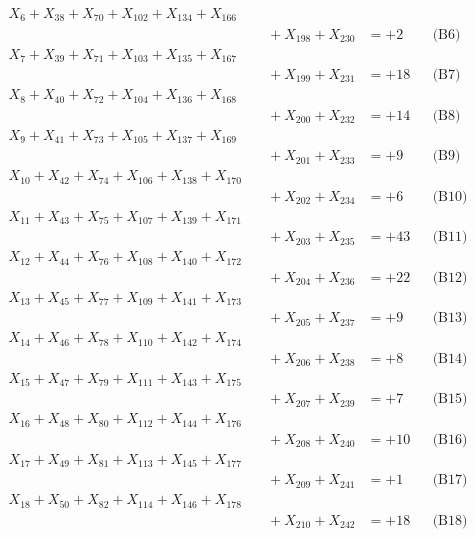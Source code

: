 \documentclass[a4paper,10pt]{article}
\begin{document}
{\begin{align}
X_{6} + X_{38} + X_{70} + X_{102} + X_{134} + X_{166} \\[0.1ex]
&\quad  + X_{198} + X_{230} &= +2 && \text{(B6)} \\
\allowbreak
X_{7} + X_{39} + X_{71} + X_{103} + X_{135} + X_{167} \\[0.1ex]
&\quad  + X_{199} + X_{231} &= +18 && \text{(B7)} \\
X_{8} + X_{40} + X_{72} + X_{104} + X_{136} + X_{168} \\[0.1ex]
&\quad  + X_{200} + X_{232} &= +14 && \text{(B8)} \\
X_{9} + X_{41} + X_{73} + X_{105} + X_{137} + X_{169} \\[0.1ex]
&\quad  + X_{201} + X_{233} &= +9 && \text{(B9)} \\
X_{10} + X_{42} + X_{74} + X_{106} + X_{138} + X_{170} \\[0.1ex]
&\quad  + X_{202} + X_{234} &= +6 && \text{(B10)} \\
X_{11} + X_{43} + X_{75} + X_{107} + X_{139} + X_{171} \\[0.1ex]
&\quad  + X_{203} + X_{235} &= +43 && \text{(B11)} \\
\allowbreak
X_{12} + X_{44} + X_{76} + X_{108} + X_{140} + X_{172} \\[0.1ex]
&\quad  + X_{204} + X_{236} &= +22 && \text{(B12)} \\
X_{13} + X_{45} + X_{77} + X_{109} + X_{141} + X_{173} \\[0.1ex]
&\quad  + X_{205} + X_{237} &= +9 && \text{(B13)} \\
X_{14} + X_{46} + X_{78} + X_{110} + X_{142} + X_{174} \\[0.1ex]
&\quad  + X_{206} + X_{238} &= +8 && \text{(B14)} \\
X_{15} + X_{47} + X_{79} + X_{111} + X_{143} + X_{175} \\[0.1ex]
&\quad  + X_{207} + X_{239} &= +7 && \text{(B15)} \\
X_{16} + X_{48} + X_{80} + X_{112} + X_{144} + X_{176} \\[0.1ex]
&\quad  + X_{208} + X_{240} &= +10 && \text{(B16)} \\
\allowbreak
X_{17} + X_{49} + X_{81} + X_{113} + X_{145} + X_{177} \\[0.1ex]
&\quad  + X_{209} + X_{241} &= +1 && \text{(B17)} \\
X_{18} + X_{50} + X_{82} + X_{114} + X_{146} + X_{178} \\[0.1ex]
&\quad  + X_{210} + X_{242} &= +18 && \text{(B18)} \\

\end{align}}
\end{document}
